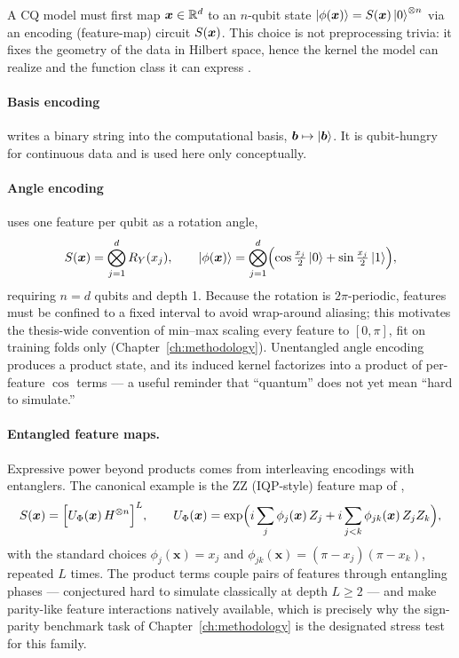 A CQ model must first map $\bm{x} \in \mathbb{R}^d$ to an $n$-qubit state
$\left|\phi(\bm{x})\right\rangle = S(\bm{x}) \left|0\right\rangle^{\otimes n}$ via an encoding
(feature-map) circuit $S(\bm{x})$. This choice is not preprocessing
trivia: it fixes the geometry of the data in Hilbert space, hence the kernel
the model can realize and the function class it can express
\citep{schuld2019hilbert, schuld2021fourier, larose2020encodings}.

\paragraph{Basis encoding} writes a binary string into the computational
basis, $\bm{b} \mapsto \left|\bm{b}\right\rangle$. It is qubit-hungry for continuous data
and is used here only conceptually.

\paragraph{Angle encoding} uses one feature per qubit as a rotation angle,
\begin{equation}
  S(\bm{x}) = \bigotimes_{j=1}^{d} R_{Y}(x_j),
  \qquad
  \left|\phi(\bm{x})\right\rangle = \bigotimes_{j=1}^{d}
    \Bigl( \cos\tfrac{x_j}{2}\left|0\right\rangle + \sin\tfrac{x_j}{2}\left|1\right\rangle \Bigr),
  \label{eq:angle-encoding}
\end{equation}
requiring $n = d$ qubits and depth 1. Because the rotation is $2\pi$-periodic,
features must be confined to a fixed interval to avoid wrap-around aliasing;
this motivates the thesis-wide convention of min--max scaling every feature to
$[0, \pi]$, fit on training folds only (Chapter~\ref{ch:methodology}).
Unentangled angle encoding produces a product state, and its induced kernel
factorizes into a product of per-feature $\cos$ terms --- a useful reminder
that ``quantum'' does not yet mean ``hard to simulate.''

\paragraph{Entangled feature maps.} Expressive power beyond products comes
from interleaving encodings with entanglers. The canonical example is the
ZZ (IQP-style) feature map of \citet{havlicek2019kernels},
\begin{equation}
  S(\bm{x})
  = \Bigl[ U_{\Phi}(\bm{x})\, H^{\otimes n} \Bigr]^{L},
  \qquad
  U_{\Phi}(\bm{x}) = \exp\Bigl( i \sum_{j} \phi_j(\bm{x})\, Z_j
      + i \sum_{j < k} \phi_{jk}(\bm{x})\, Z_j Z_k \Bigr),
  \label{eq:zz-map}
\end{equation}
with the standard choices $\phi_j(\bm{x}) = x_j$ and
$\phi_{jk}(\bm{x}) = (\pi - x_j)(\pi - x_k)$, repeated $L$ times. The
product terms couple pairs of features through entangling phases ---
conjectured hard to simulate classically at depth $L \ge 2$ --- and make
parity-like feature interactions natively available, which is precisely why
the sign-parity benchmark task of Chapter~\ref{ch:methodology} is the
designated stress test for this family.

